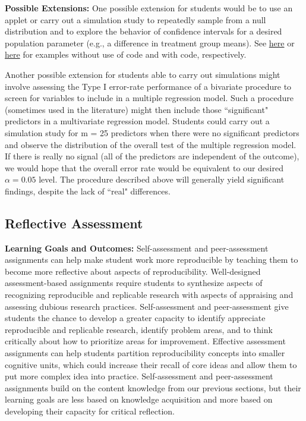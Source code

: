 \documentclass[
  12pt]{article}
\begin{document}
\textbf{Possible Extensions:}
One possible extension for students would be to use an applet or carry out a simulation study to repeatedly sample from a null distribution and to explore the behavior of confidence intervals for a desired population parameter (e.g., a difference in treatment group means).
See \href{https://www.rossmanchance.com/applets/2021/confsim/ConfSim.html}{here} or \href{https://sas-and-r.blogspot.com/2012/10/example-104-multiple-comparisons-and.html}{here} for examples without use of code and with code, respectively.

Another possible extension for students able to carry out simulations might involve assessing the Type I error-rate performance of a bivariate procedure to screen for variables to include in a multiple regression model.
Such a procedure (sometimes used in the literature) might then include those ``significant" predictors in a multivariate regression model.
Students could carry out a simulation study for m = 25 predictors when there were no significant predictors and observe the distribution of the overall test of the multiple regression model.
If there is really no signal (all of the predictors are independent of the outcome), we would hope that the overall error rate would be equivalent to our desired $\alpha = 0.05$ level.
The procedure described above will generally yield significant findings, despite the lack of ``real" differences.

\subsection{Reflective Assessment} \label{sec-assessment}

\textbf{Learning Goals and Outcomes:} Self-assessment and peer-assessment assignments can help make student work more reproducible by teaching them to become more reflective about aspects of reproducibility. 
Well-designed assessment-based assignments require students to synthesize aspects of recognizing reproducible and replicable research with aspects of appraising and assessing dubious research practices. 
Self-assessment and peer-assessment give students the chance to develop a greater capacity to identify appreciate reproducible and replicable research, identify problem areas, and to think critically about how to prioritize areas for improvement. 
Effective assessment assignments can help students partition reproducibility concepts into smaller cognitive units, which could increase their recall of core ideas and allow them to put more complex idea into practice. 
Self-assessment and peer-assessment assignments build on the content knowledge from our previous sections, but their learning goals are less based on knowledge acquisition and more based on developing their capacity for critical reflection. 
\end{document}
